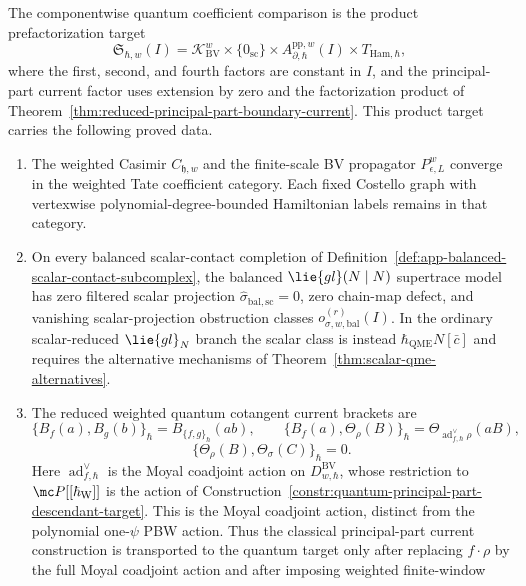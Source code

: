 \documentclass[11pt]{memoir}
\begin{document}
\begin{thm}
  The componentwise quantum coefficient comparison is the product
  prefactorization target
  \[
    \mathfrak S_{\hbar,w}(I)
      =
      \mathcal K_{\mathrm{BV}}^w
      \times\{0_{\mathrm{sc}}\}
      \times A^{\mathrm{pp},w}_{\partial,\hbar}(I)
      \times T_{\mathrm{Ham},\hbar},
  \]
  where the first, second, and fourth factors are constant in \(I\), and
  the principal-part current factor uses extension by zero and the
  factorization product of
  Theorem~\ref{thm:reduced-principal-part-boundary-current}.
  This product target carries the following proved data.
  \begin{enumerate}
    \item The weighted Casimir \(C_{\mathfrak h,w}\) and the finite-scale
      BV propagator \(P_{\epsilon,L}^w\) converge in the weighted Tate
      coefficient category.  Each fixed Costello graph with
      vertexwise polynomial-degree-bounded Hamiltonian labels remains in
      that category.
    \item On every balanced scalar-contact completion of
      Definition~\ref{def:app-balanced-scalar-contact-subcomplex}, the
      balanced \(\lie{gl}(N\mid N)\) supertrace model has zero filtered
      scalar projection
      \(\widehat\sigma_{\mathrm{bal,sc}}=0\), zero chain-map defect, and
      vanishing scalar-projection obstruction classes
      \(o_{\sigma,w,\mathrm{bal}}^{(r)}(I)\).  In the ordinary
      scalar-reduced \(\lie{gl}_N\) branch the scalar class is instead
      \(\hbar_{\mathrm{QME}}N[\bar c]\) and requires the alternative mechanisms of
      Theorem~\ref{thm:scalar-qme-alternatives}.
    \item The reduced weighted quantum cotangent current brackets are
      \[
        \{B_f(a),B_g(b)\}_\hbar
          =B_{\{f,g\}_\hbar}(ab),\qquad
        \{B_f(a),\Theta_\rho(B)\}_\hbar
          =\Theta_{\operatorname{ad}^{\vee}_{f,\hbar}\rho}(aB),
      \]
      \[
        \{\Theta_\rho(B),\Theta_\sigma(C)\}_\hbar=0 .
      \]
      Here \(\operatorname{ad}^{\vee}_{f,\hbar}\) is the Moyal coadjoint
      action on \(D^{\mathrm{BV}}_{w,\hbar}\), whose
      restriction to \(\mc P[[\hbar_{\mathrm{W}}]]\) is the action of
      Construction~\ref{constr:quantum-principal-part-descendant-target}.
      This is the Moyal coadjoint action, distinct from the polynomial
      one-\(\psi\) PBW action.  Thus the
      classical principal-part current construction is transported to the
      quantum target only after replacing \(f\cdot\rho\) by the full
      Moyal coadjoint action and after imposing weighted finite-window

\end{enumerate}
\end{thm}
\end{document}
